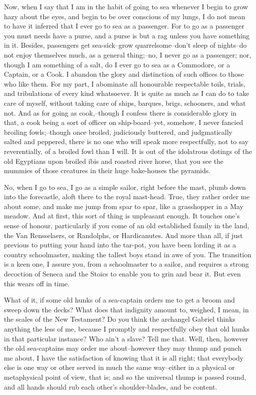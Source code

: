 Now, when I say that I am in the habit of going to sea whenever I
begin to grow hazy about the eyes, and begin to be over conscious of
my lungs, I do not mean to have it inferred that I ever go to sea as a passenger. For to go as a passenger you must needs have a purse,
and a purse is but a rag unless you have something in it. Besides,
passengers get sea-sick--grow quarrelsome--don't sleep of nights--do
not enjoy themselves much, as a general thing;--no, I never go as a
passenger; nor, though I am something of a salt, do I ever go to sea
as a Commodore, or a Captain, or a Cook. I abandon the glory and
distinction of such offices to those who like them. For my part, I
abominate all honourable respectable toils, trials, and tribulations
of every kind whatsoever. It is quite as much as I can do to take
care of myself, without taking care of ships, barques, brigs,
schooners, and what not. And as for going as cook,--though I confess
there is considerable glory in that, a cook being a sort of officer
on ship-board--yet, somehow, I never fancied broiling fowls;--though
once broiled, judiciously buttered, and judgmatically salted and
peppered, there is no one who will speak more respectfully, not to
say reverentially, of a broiled fowl than I will. It is out of the
idolatrous dotings of the old Egyptians upon broiled ibis and roasted
river horse, that you see the mummies of those creatures in their
huge bake-houses the pyramids.

No, when I go to sea, I go as a simple sailor, right before the mast,
plumb down into the forecastle, aloft there to the royal mast-head.
True, they rather order me about some, and make me jump from spar to
spar, like a grasshopper in a May meadow. And at first, this sort of
thing is unpleasant enough. It touches one's sense of honour,
particularly if you come of an old established family in the land,
the Van Rensselaers, or Randolphs, or Hardicanutes. And more than
all, if just previous to putting your hand into the tar-pot, you have
been lording it as a country schoolmaster, making the tallest boys
stand in awe of you. The transition is a keen one, I assure you,
from a schoolmaster to a sailor, and requires a strong decoction of
Seneca and the Stoics to enable you to grin and bear it. But even
this wears off in time.

What of it, if some old hunks of a sea-captain orders me to get a
broom and sweep down the decks? What does that indignity amount to,
weighed, I mean, in the scales of the New Testament? Do you think
the archangel Gabriel thinks anything the less of me, because I
promptly and respectfully obey that old hunks in that particular
instance? Who ain't a slave? Tell me that. Well, then, however the
old sea-captains may order me about--however they may thump and punch
me about, I have the satisfaction of knowing that it is all right;
that everybody else is one way or other served in much the same
way--either in a physical or metaphysical point of view, that is; and
so the universal thump is passed round, and all hands should rub each
other's shoulder-blades, and be content.


